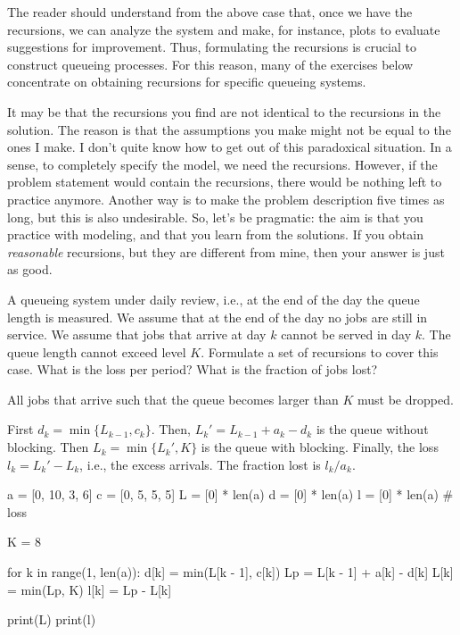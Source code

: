 The reader should understand from the above case that, once we have the recursions, we can analyze the system and make, for instance, plots to evaluate suggestions for improvement.
Thus, formulating the recursions is crucial to construct queueing processes.
For this reason, many of the exercises below concentrate on obtaining recursions for specific queueing systems.

It may be that the recursions you find are not identical to the recursions in the solution.
The reason is that the assumptions you make might not be equal to the ones I make.
I don't quite know how to get out of this paradoxical situation.
In a sense, to completely specify the model, we need the recursions.
However, if the problem statement would contain the recursions, there would be nothing left to practice anymore.
Another way is to make the problem description five times as long, but this is also undesirable.
So, let's be pragmatic: the aim is that you practice with modeling, and that you learn from the solutions.
If you obtain \emph{reasonable} recursions, but they are different from mine, then your answer is just as good.

\begin{exercise} 
A queueing system
 under daily review, i.e., at the end of the day the queue length is
 measured. We assume that at the end of the day no jobs are still in
 service. We assume that jobs that arrive at day $k$ cannot be served
 in day $k$. The queue length cannot exceed level $K$. Formulate a
 set of recursions to cover this case. What is the loss per period? What is the fraction of jobs lost?
\begin{solution}
 All jobs that arrive such that the queue becomes larger than $K$ must be dropped.

 First $d_k = \min\{L_{k-1}, c_k\}$. Then, $L_k' = L_{k-1}+a_k-d_k$ is the queue without blocking. Then $L_k=\min\{L_k', K\}$ is the queue with blocking. Finally, the loss $l_k=L_k'-L_k$, i.e., the excess arrivals. The fraction lost is $l_k/a_k$.

\begin{pyconsole}
a = [0, 10, 3, 6]
c = [0, 5, 5, 5]
L = [0] * len(a)
d = [0] * len(a)
l = [0] * len(a)  # loss

K = 8

for k in range(1, len(a)):
    d[k] = min(L[k - 1], c[k])
    Lp = L[k - 1] + a[k] - d[k]
    L[k] = min(Lp, K)
    l[k] = Lp - L[k]


print(L)
print(l)
\end{pyconsole}
\end{solution}
\end{exercise}

